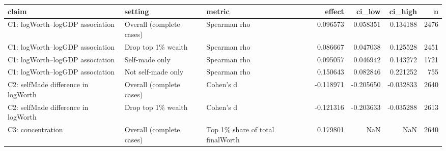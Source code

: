 \begin{tabular}{lllrrrr}
\toprule
claim & setting & metric & effect & ci\_low & ci\_high & n \\
\midrule
C1: logWorth--logGDP association & Overall (complete cases) & Spearman rho & 0.096573 & 0.058351 & 0.134188 & 2476 \\
C1: logWorth--logGDP association & Drop top 1\% wealth & Spearman rho & 0.086667 & 0.047038 & 0.125528 & 2451 \\
C1: logWorth--logGDP association & Self-made only & Spearman rho & 0.095057 & 0.046942 & 0.143272 & 1721 \\
C1: logWorth--logGDP association & Not self-made only & Spearman rho & 0.150643 & 0.082846 & 0.221252 & 755 \\
C2: selfMade difference in logWorth & Overall (complete cases) & Cohen's d & -0.118971 & -0.205650 & -0.032833 & 2640 \\
C2: selfMade difference in logWorth & Drop top 1\% wealth & Cohen's d & -0.121316 & -0.203633 & -0.035288 & 2613 \\
C3: concentration & Overall (complete cases) & Top 1\% share of total finalWorth & 0.179801 & NaN & NaN & 2640 \\
\bottomrule
\end{tabular}
